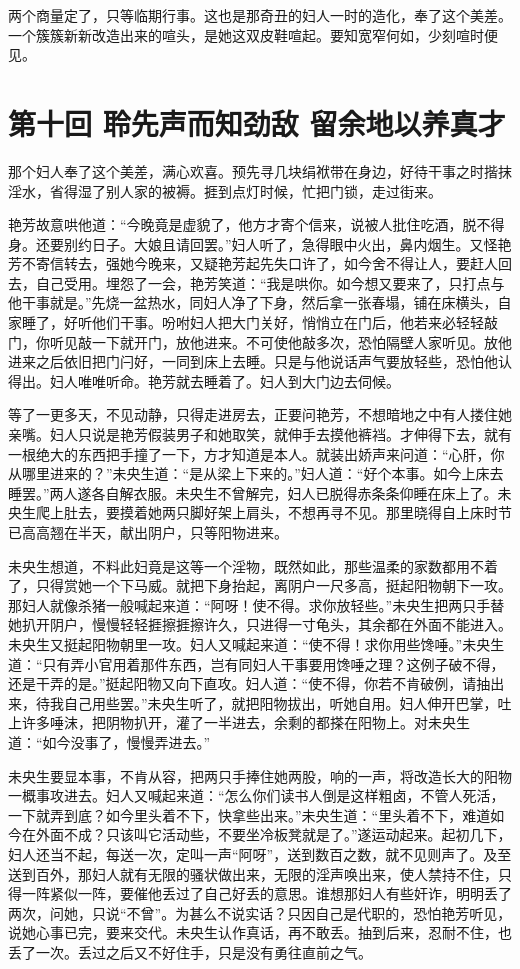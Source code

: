 \documentclass[a4paper,12pt,UTF8,twoside]{ctexbook}
\begin{document}
两个商量定了，只等临期行事。这也是那奇丑的妇人一时的造化，奉了这个美差。一个簇簇新新改造出来的喧头，是她这双皮鞋喧起。要知宽窄何如，少刻喧时便见。

\chapter{第十回 聆先声而知劲敌 留余地以养真才}

那个妇人奉了这个美差，满心欢喜。预先寻几块绢袱带在身边，好待干事之时揩抹淫水，省得湿了别人家的被褥。捱到点灯时候，忙把门锁，走过街来。

艳芳故意哄他道：“今晚竟是虚貌了，他方才寄个信来，说被人批住吃酒，脱不得身。还要别约日子。大娘且请回罢。”妇人听了，急得眼中火出，鼻内烟生。又怪艳芳不寄信转去，强她今晚来，又疑艳芳起先失口许了，如今舍不得让人，要赶人回去，自己受用。埋怨了一会，艳芳笑道：“我是哄你。如今想又要来了，只打点与他干事就是。”先烧一盆热水，同妇人净了下身，然后拿一张春塌，铺在床横头，自家睡了，好听他们干事。吩咐妇人把大门关好，悄悄立在门后，他若来必轻轻敲门，你听见敲一下就开门，放他进来。不可使他敲多次，恐怕隔壁人家听见。放他进来之后依旧把门闩好，一同到床上去睡。只是与他说话声气要放轻些，恐怕他认得出。妇人唯唯听命。艳芳就去睡着了。妇人到大门边去伺候。

等了一更多天，不见动静，只得走进房去，正要问艳芳，不想暗地之中有人搂住她亲嘴。妇人只说是艳芳假装男子和她取笑，就伸手去摸他裤裆。才伸得下去，就有一根绝大的东西把手撞了一下，方才知道是本人。就装出娇声来问道：“心肝，你从哪里进来的？”未央生道：“是从梁上下来的。”妇人道：“好个本事。如今上床去睡罢。”两人遂各自解衣服。未央生不曾解完，妇人已脱得赤条条仰睡在床上了。未央生爬上肚去，要摸着她两只脚好架上肩头，不想再寻不见。那里晓得自上床时节已高高翘在半天，献出阴户，只等阳物进来。

未央生想道，不料此妇竟是这等一个淫物，既然如此，那些温柔的家数都用不着了，只得赏她一个下马威。就把下身抬起，离阴户一尺多高，挺起阳物朝下一攻。那妇人就像杀猪一般喊起来道：“阿呀！使不得。求你放轻些。”未央生把两只手替她扒开阴户，慢慢轻轻捱擦捱擦许久，只进得一寸龟头，其余都在外面不能进入。未央生又挺起阳物朝里一攻。妇人又喊起来道：“使不得！求你用些馋唾。”未央生道：“只有弄小官用着那件东西，岂有同妇人干事要用馋唾之理？这例子破不得，还是干弄的是。”挺起阳物又向下直攻。妇人道：“使不得，你若不肯破例，请抽出来，待我自己用些罢。”未央生听了，就把阳物拔出，听她自用。妇人伸开巴掌，吐上许多唾沫，把阴物扒开，灌了一半进去，余剩的都搽在阳物上。对未央生道：“如今没事了，慢慢弄进去。”

未央生要显本事，不肯从容，把两只手捧住她两股，响的一声，将改造长大的阳物一概事攻进去。妇人又喊起来道：“怎么你们读书人倒是这样粗卤，不管人死活，一下就弄到底？如今里头着不下，快拿些出来。”未央生道：“里头着不下，难道如今在外面不成？只该叫它活动些，不要坐冷板凳就是了。”遂运动起来。起初几下，妇人还当不起，每送一次，定叫一声“阿呀”，送到数百之数，就不见则声了。及至送到百外，那妇人就有无限的骚状做出来，无限的淫声唤出来，使人禁持不住，只得一阵紧似一阵，要催他丢过了自己好丢的意思。谁想那妇人有些奸诈，明明丢了两次，问她，只说“不曾”。为甚么不说实话？只因自己是代职的，恐怕艳芳听见，说她心事已完，要来交代。未央生认作真话，再不敢丢。抽到后来，忍耐不住，也丢了一次。丢过之后又不好住手，只是没有勇往直前之气。
\end{document}
